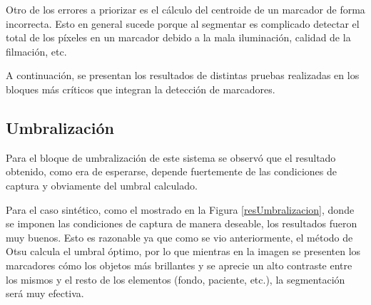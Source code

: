 Otro de los errores a priorizar es el cálculo del centroide de un marcador de forma incorrecta. Esto en general sucede porque al segmentar es complicado detectar el total de los píxeles en un marcador debido a la mala iluminación, calidad de la filmación, etc.

A continuación, se presentan los resultados de distintas pruebas realizadas en los bloques más críticos que integran la detección de marcadores.

\subsection{Umbralización}

Para el bloque de umbralización de este sistema se observó que el resultado obtenido, como era de esperarse, depende fuertemente de las condiciones de captura y obviamente del umbral calculado. 

Para el caso sintético, como el mostrado en la Figura \ref{resUmbralizacion}, donde se imponen las condiciones de captura de manera deseable, los resultados fueron muy buenos. Esto es razonable ya que como se vio anteriormente, el método de Otsu calcula el umbral óptimo, por lo que mientras en la imagen se presenten los marcadores cómo los objetos más brillantes y se aprecie un alto contraste entre los mismos y el resto de los elementos (fondo, paciente, etc.), la segmentación será muy efectiva.

